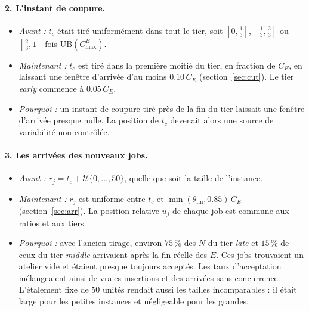 \documentclass[11pt,a4paper]{article}
\newcommand{\UB}{\mathrm{UB}}
\newcommand{\CE}{C_E}
\begin{document}
\paragraph{2. L'instant de coupure.}
\begin{itemize}
  \item \emph{Avant :} $t_c$ était tiré uniformément dans tout le tier, soit $[0, \tfrac13]$, $[\tfrac13, \tfrac23]$ ou $[\tfrac23, 1]$ fois $\UB(C^E_{\max})$.
  \item \emph{Maintenant :} $t_c$ est tiré dans la première moitié du tier, en fraction de $\CE$, en laissant une fenêtre d'arrivée d'au moins $0.10\,\CE$ (section~\ref{sec:cut}). Le tier \emph{early} commence à $0.05\,\CE$.
  \item \emph{Pourquoi :} un instant de coupure tiré près de la fin du tier laissait une fenêtre d'arrivée presque nulle. La position de $t_c$ devenait alors une source de variabilité non contrôlée.
\end{itemize}

\paragraph{3. Les arrivées des nouveaux jobs.}
\begin{itemize}
  \item \emph{Avant :} $r_j = t_c + \mathcal{U}\{0,\dots,50\}$, quelle que soit la taille de l'instance.
  \item \emph{Maintenant :} $r_j$ est uniforme entre $t_c$ et $\min(\theta_{\mathrm{fin}}, 0.85)\,\CE$ (section~\ref{sec:arr}). La position relative $u_j$ de chaque job est commune aux ratios et aux tiers.
  \item \emph{Pourquoi :} avec l'ancien tirage, environ $75\,\%$ des $N$ du tier \emph{late} et $15\,\%$ de ceux du tier \emph{middle} arrivaient après la fin réelle des $E$. Ces jobs trouvaient un atelier vide et étaient presque toujours acceptés. Les taux d'acceptation mélangeaient ainsi de vraies insertions et des arrivées sans concurrence. L'étalement fixe de $50$ unités rendait aussi les tailles incomparables : il était large pour les petites instances et négligeable pour les grandes.
\end{itemize}
\end{document}
